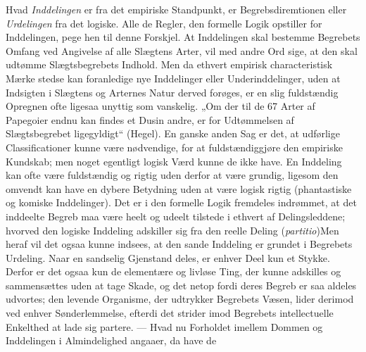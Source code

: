\documentclass[12pt]{book}
\newcommand{\opage}[1]{\marginnote{\footnotesize\textit{[#1]}}}
\begin{document}
Hvad \emph{Inddelingen} er fra det empiriske Standpunkt, er Begrebsdiremtionen eller
\emph{Urdelingen} fra det logiske. Alle de Regler, den formelle Logik opstiller for
Inddelingen, pege hen til denne Forskjel. At Inddelingen skal bestemme Begrebets
Omfang ved Angivelse af alle Slægtens Arter, vil med andre Ord sige, at den skal
udtømme Slægtsbegrebets Indhold. Men da ethvert empirisk characteristisk Mærke stedse
kan foranledige nye Inddelinger eller Underinddelinger, uden at Indsigten i Slægtens
og Arternes Natur derved forøges, er en slig fuldstændig Opregnen ofte ligesaa unyttig
som vanskelig. „Om der til de 67 Arter af Papegoier endnu kan findes et Dusin andre,
er for Udtømmelsen af Slægtsbegrebet ligegyldigt“ (Hegel). En ganske anden Sag er det,
\opage{67} at udførlige Classificationer kunne være nødvendige, for at fuldstændiggjøre den
empiriske Kundskab; men noget egentligt logisk Værd kunne de ikke have. En Inddeling
kan ofte være fuldstændig og rigtig uden derfor at være grundig, ligesom den omvendt
kan have en dybere Betydning uden at være logisk rigtig (phantastiske og komiske
Inddelinger). Det er i den formelle Logik fremdeles indrømmet, at det inddeelte
Begreb maa være heelt og udeelt tilstede i ethvert af Delingsleddene; hvorved den
logiske Inddeling adskiller sig fra den reelle Deling (\textit{partitio})\quad Men
heraf vil det ogsaa kunne indsees, at den sande Inddeling er grundet i Begrebets
Urdeling. Naar en sandselig Gjenstand deles, er enhver Deel kun et Stykke. Derfor er
det ogsaa kun de elementære og livløse Ting, der kunne adskilles og sammensættes uden
at tage Skade, og det netop fordi deres Begreb er saa aldeles udvortes; den levende
Organisme, der udtrykker Begrebets Væsen, lider derimod ved enhver Sønderlemmelse,
efterdi det strider imod Begrebets intellectuelle Enkelthed at lade sig partere. ---
Hvad nu Forholdet imellem Dommen og Inddelingen i Almindelighed angaaer, da have de
\end{document}
